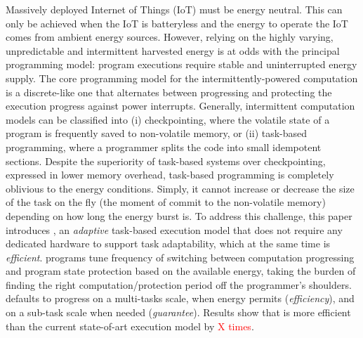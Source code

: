Massively deployed Internet of Things (IoT) must be energy neutral. This can only be achieved when the IoT is batteryless and the energy to operate the IoT comes from ambient energy sources.
However, relying on the highly varying, unpredictable and intermittent harvested energy is at odds with the principal programming model: program executions require stable and uninterrupted energy supply. 
The core programming model for the intermittently-powered computation is a discrete-like one that alternates between progressing and protecting the execution progress against power interrupts.
Generally, intermittent computation models can be classified into (i) checkpointing, where the volatile state of a program is frequently saved to non-volatile memory, or (ii) task-based programming, where a programmer splits the code into small idempotent sections. Despite the superiority of task-based systems over checkpointing, expressed in lower memory overhead, task-based programming is completely oblivious to the energy conditions. Simply, it cannot increase or decrease the size of the task on the fly (the moment of commit to the non-volatile memory) depending on how long the energy burst is. 
To address this challenge, this paper introduces \sys, an \emph{adaptive} task-based execution model that does not require any dedicated hardware to support task adaptability, which at the same time is \emph{efficient}.
\sys programs tune frequency of switching between computation progressing and program state protection based on the available energy, taking the burden of finding the right computation/protection period off the programmer's shoulders.
\sys defaults to progress on a multi-tasks scale, when energy permits (\emph{efficiency}), and on a sub-task scale when needed (\emph{guarantee}).
Results show that \sys is more efficient than the current state-of-art execution model by \textcolor{red}{X times}.

